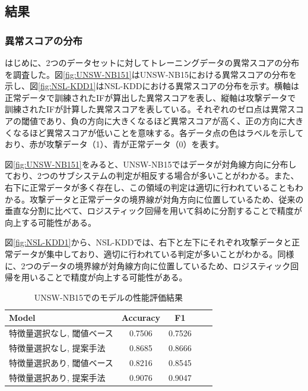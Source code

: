 \documentclass{css}
\begin{document}
\subsection{結果}

\subsubsection{異常スコアの分布}
はじめに、2つのデータセットに対してトレーニングデータの異常スコアの分布を調査した。図\ref{fig:UNSW-NB151}はUNSW-NB15における異常スコアの分布を示し、図\ref{fig:NSL-KDD1}はNSL-KDDにおける異常スコアの分布を示す。横軸は正常データで訓練されたIFが算出した異常スコアを表し、縦軸は攻撃データで訓練されたIFが計算した異常スコアを表している。それぞれのゼロ点は異常スコアの閾値であり、負の方向に大きくなるほど異常スコアが高く、正の方向に大きくなるほど異常スコアが低いことを意味する。各データ点の色はラベルを示しており、赤が攻撃データ（1）、青が正常データ（0）を表す。

図\ref{fig:UNSW-NB151}をみると、UNSW-NB15ではデータが対角線方向に分布しており、2つのサブシステムの判定が相反する場合が多いことがわかる。また、右下に正常データが多く存在し、この領域の判定は適切に行われていることもわかる。攻撃データと正常データの境界線が対角方向に位置しているため、従来の垂直な分割に比べて、ロジスティック回帰を用いて斜めに分割することで精度が向上する可能性がある。

図\ref{fig:NSL-KDD1}から、NSL-KDDでは、右下と左下にそれぞれ攻撃データと正常データが集中しており、適切に行われている判定が多いことがわかる。同様に、2つのデータの境界線が対角線方向に位置しているため、ロジスティック回帰を用いることで精度が向上する可能性がある。

\begin{table}[ht]
    \caption{UNSW-NB15でのモデルの性能評価結果}
    \centering
    \footnotesize
    \begin{tabular}{lcccc}
        \hline\hline
        Model & Accuracy & F1 \\
        \hline
        特徴量選択なし, 閾値ベース & 0.7506 & 0.7526 \\
        特徴量選択なし, 提案手法 & 0.8685 & 0.8666 \\
        特徴量選択あり, 閾値ベース & 0.8216 & 0.8545 \\
        特徴量選択あり, 提案手法 & 0.9076 & 0.9047 \\
        \hline
    \end{tabular}
    \label{tab:model_performance_UNSW-NB15}
\end{table}
\end{document}
